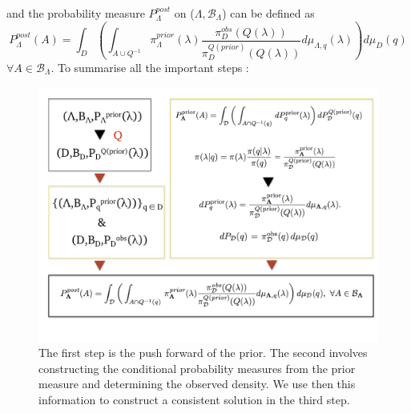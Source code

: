 \documentclass[11pt, a4paper, English]{report}
\begin{document}
and the probability measure $P_\Lambda^{post}$ on ($\Lambda, \mathcal{B}_\Lambda$) can be defined as 
$$P_\Lambda^{post}(A) = \int_D(\int_{A\cup Q^{-1}} \pi_\Lambda^{prior}(\lambda)\frac{\pi_D^{obs}(Q(\lambda))}{\pi_D^{Q(prior)}(Q(\lambda))} d\mu_{\Lambda,q}(\lambda) )d\mu_D(q) $$
$\forall A \in \mathcal{B}_\Lambda$. To summarise all the important steps :
\begin{figure}[h!]
    \centering
    \includegraphics[scale=0.33]{schemm.png}
    \caption{The first step is the push forward of the prior. The second involves constructing the conditional probability measures from the prior measure and determining the observed density. We use then this information to construct a consistent solution in the third step.}
    \label{fig:my_label}
\end{figure}
\end{document}
